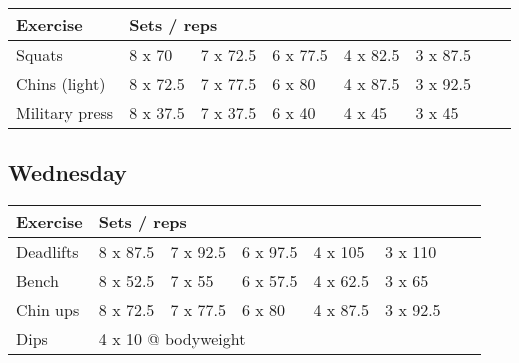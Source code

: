 \documentclass[12pt, a4paper]{article}%
\begin{document}
  \begin{tabular}{l|lllllll}
  \hspace{0.75em} \textbf{Exercise} & \multicolumn{ 7 }{l}{ \textbf{Sets / reps} } \\ \hline

            \hspace{0.75em} Squats
            & 8 x 70
            & 7 x 72.5
            & 6 x 77.5
            & 4 x 82.5
            & 3 x 87.5
            & 
            & 
            \\


            \hspace{0.75em} Chins (light)
            & 8 x 72.5
            & 7 x 77.5
            & 6 x 80
            & 4 x 87.5
            & 3 x 92.5
            & 
            & 
            \\


            \hspace{0.75em} Military press
            & 8 x 37.5
            & 7 x 37.5
            & 6 x 40
            & 4 x 45
            & 3 x 45
            & 
            & 
            \\


  \end{tabular}

  \subsection*{\hspace{0.5em} Wednesday }


  \begin{tabular}{l|lllllll}
  \hspace{0.75em} \textbf{Exercise} & \multicolumn{ 7 }{l}{ \textbf{Sets / reps} } \\ \hline

            \hspace{0.75em} Deadlifts
            & 8 x 87.5
            & 7 x 92.5
            & 6 x 97.5
            & 4 x 105
            & 3 x 110
            & 
            & 
            \\


            \hspace{0.75em} Bench
            & 8 x 52.5
            & 7 x 55
            & 6 x 57.5
            & 4 x 62.5
            & 3 x 65
            & 
            & 
            \\


            \hspace{0.75em} Chin ups
            & 8 x 72.5
            & 7 x 77.5
            & 6 x 80
            & 4 x 87.5
            & 3 x 92.5
            & 
            & 
            \\


   \hspace{0.75em} Dips &  \multicolumn{ 7 }{l}{ 4 x 10 @ bodyweight } \\
  \end{tabular}
\end{document}

